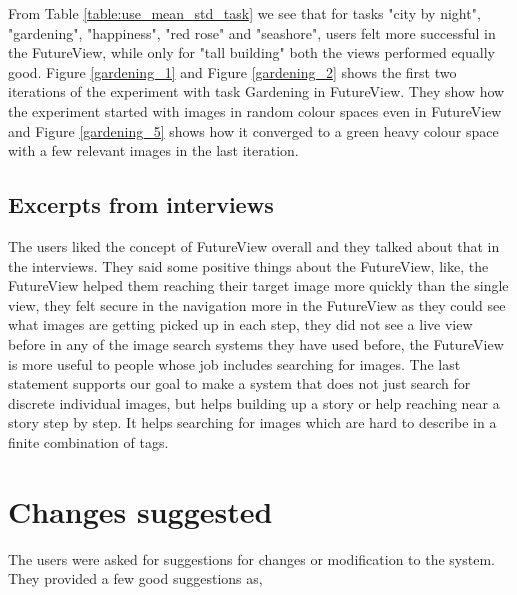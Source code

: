 \documentclass[english]{tktltiki}
\begin{document}
From Table \ref{table:use_mean_std_task} we see that for tasks "city by night", "gardening", "happiness", "red rose" and "seashore", users felt more successful in the FutureView, while only for "tall building" both the views performed equally good. Figure \ref{gardening_1} and Figure \ref{gardening_2} shows the first two iterations of the experiment with task Gardening in FutureView. They show how the experiment started with images in random colour spaces even in FutureView and Figure \ref{gardening_5} shows how it converged to a green heavy colour space with a few relevant images in the last iteration.

\subsection{Excerpts from interviews}

The users liked the concept of FutureView overall and they talked about that in the interviews. They said some positive things about the FutureView, like, the FutureView helped them reaching their target image more quickly than the single view, they felt secure in the navigation more in the FutureView as they could see what images are getting picked up in each step, they did not see a live view before in any of the image search systems they have used before, the FutureView is more useful to people whose job includes searching for images. The last statement supports our goal to make a system that does not just search for discrete individual images, but helps building up a story or help reaching near a story step by step. It helps searching for images which are hard to describe in a finite combination of tags.

\section{Changes suggested}

The users were asked for suggestions for changes or modification to the system. They provided a few good suggestions as,
\end{document}
